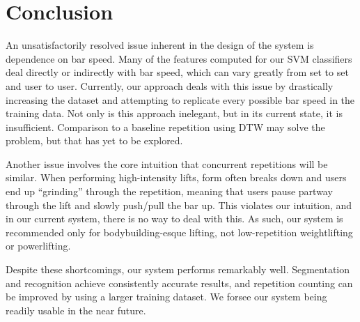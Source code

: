 \chapter{Conclusion}

An unsatisfactorily resolved issue inherent in the design of the system is dependence on bar speed. Many of the features computed for our SVM classifiers deal directly or indirectly with bar speed, which can vary greatly from set to set and user to user. Currently, our approach deals with this issue by drastically increasing the dataset and attempting to replicate every possible bar speed in the training data. Not only is this approach inelegant, but in its current state, it is insufficient. Comparison to a baseline repetition using DTW may solve the problem, but that has yet to be explored.

Another issue involves the core intuition that concurrent repetitions will be similar. When performing high-intensity lifts, form often breaks down and users end up ``grinding'' through the repetition, meaning that users pause partway through the lift and slowly push/pull the bar up. This violates our intuition, and in our current system, there is no way to deal with this. As such, our system is recommended only for bodybuilding-esque lifting, not low-repetition weightlifting or powerlifting.

Despite these shortcomings, our system performs remarkably well. Segmentation and recognition achieve consistently accurate results, and repetition counting can be improved by using a larger training dataset. We forsee our system being readily usable in the near future. 